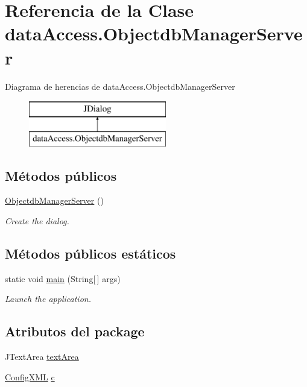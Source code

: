 \hypertarget{classdata_access_1_1_objectdb_manager_server}{}\section{Referencia de la Clase data\+Access.\+Objectdb\+Manager\+Server}
\label{classdata_access_1_1_objectdb_manager_server}
Diagrama de herencias de data\+Access.\+Objectdb\+Manager\+Server\begin{figure}[H]
\begin{center}
\leavevmode
\includegraphics[height=2.000000cm]{classdata_access_1_1_objectdb_manager_server}
\end{center}
\end{figure}
\subsection*{Métodos públicos}
\begin{DoxyCompactItemize}
\item 
\mbox{\hyperlink{classdata_access_1_1_objectdb_manager_server_a6aac62b0bbbebbb54d3105d5820c0061}{Objectdb\+Manager\+Server}} ()
\begin{DoxyCompactList}\small\item\em Create the dialog. \end{DoxyCompactList}\end{DoxyCompactItemize}
\subsection*{Métodos públicos estáticos}
\begin{DoxyCompactItemize}
\item 
static void \mbox{\hyperlink{classdata_access_1_1_objectdb_manager_server_a2e0f5eddf461be78de905ca56e4295f9}{main}} (String\mbox{[}$\,$\mbox{]} args)
\begin{DoxyCompactList}\small\item\em Launch the application. \end{DoxyCompactList}\end{DoxyCompactItemize}
\subsection*{Atributos del \textquotesingle{}package\textquotesingle{}}
\begin{DoxyCompactItemize}
\item 
J\+Text\+Area \mbox{\hyperlink{classdata_access_1_1_objectdb_manager_server_ab739ebdf3a077579c9af7a881c620fd4}{text\+Area}}
\item 
\mbox{\hyperlink{classconfiguration_1_1_config_x_m_l}{Config\+X\+ML}} \mbox{\hyperlink{classdata_access_1_1_objectdb_manager_server_af08ecdac594a6dcaa286d9f52087d13f}{c}}
\end{DoxyCompactItemize}

